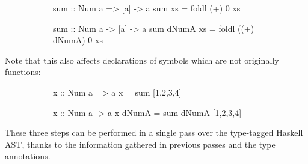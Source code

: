 \documentclass[dissertation.tex]{subfiles}
\begin{document}
{{{\begin{enumerate}
{                \begin{figure}[H]
                \centering
                \begin{subfigure}[t]{0.30\textwidth}
                \begin{haskellfigure}
                sum :: Num a => [a] -> a
                sum xs = foldl (+) 0 xs
                \end{haskellfigure}
                \end{subfigure}
                \hspace{5mm}
                \begin{subfigure}[t]{0.45\textwidth}
                \begin{haskellfigure}
                sum :: Num a -> [a] -> a
                sum dNumA xs = foldl ((+) dNumA) 0 xs
                \end{haskellfigure}
                \end{subfigure}
                \end{figure}

                Note that this also affects declarations of symbols which are not originally functions:

                \begin{figure}[H]
                \centering
                \begin{subfigure}[t]{0.30\textwidth}
                \begin{haskellfigure}
                x :: Num a => a
                x = sum [1,2,3,4]
                \end{haskellfigure}
                \end{subfigure}
                \hspace{5mm}
                \begin{subfigure}[t]{0.45\textwidth}
                \begin{haskellfigure}
                x :: Num a -> a
                x dNumA = sum dNumA [1,2,3,4]
                \end{haskellfigure}
                \end{subfigure}
                \end{figure}

            }
            \end{enumerate}

            These three steps can be performed in a single pass over the type-tagged Haskell AST, thanks to the information gathered in previous passes and the type annotations.

}}}
\end{document}
